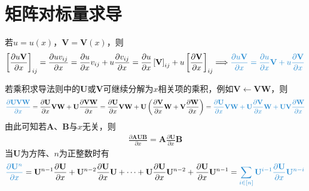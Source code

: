 \documentclass{ctexart}
\newcommand{\blue}[1]{\textcolor{Solarized-blue}{#1}}
\theoremstyle{definition}
\def \Av {\mathbf{A}}
\def \Bv {\mathbf{B}}
\def \Uv {\mathbf{U}}
\def \Vv {\mathbf{V}}
\def \Wv {\mathbf{W}}
\begin{document}
\section{矩阵对标量求导}

若$u = u(x)$，$\Vv = \Vv(x)$，则
\begin{align*}
    \left[ \frac{\partial u \Vv}{\partial x} \right]_{ij} = \frac{\partial u v_{ij}}{\partial x} = \frac{\partial u}{\partial x} v_{ij} + u \frac{\partial v_{ij}}{\partial x} = \frac{\partial u}{\partial x} \left[ \Vv \right]_{ij} + u \left[ \frac{\partial \Vv}{\partial x} \right]_{ij} \Longrightarrow \blue{\frac{\partial u \Vv}{\partial x} = \frac{\partial u}{\partial x} \Vv + u \frac{\partial \Vv}{\partial x}}
\end{align*}

若乘积求导法则中的$\Uv$或$\Vv$可继续分解为$x$相关项的乘积，例如$\Vv \leftarrow \Vv \Wv$，则
\begin{align} \label{eq: product}
    \blue{\frac{\partial \Uv \Vv \Wv}{\partial x}} = \frac{\partial \Uv}{\partial x} \Vv \Wv + \Uv \frac{\partial \Vv \Wv}{\partial x} = \frac{\partial \Uv}{\partial x} \Vv \Wv + \Uv \left( \frac{\partial \Vv}{\partial x} \Wv + \Vv \frac{\partial \Wv}{\partial x} \right) = \blue{\frac{\partial \Uv}{\partial x} \Vv \Wv + \Uv \frac{\partial \Vv}{\partial x} \Wv + \Uv \Vv \frac{\partial \Wv}{\partial x}}
\end{align}
由此可知若$\Av$、$\Bv$与$x$无关，则
\begin{align*}
    \frac{\partial \Av \Uv \Bv}{\partial x} = \Av \frac{\partial \Uv}{\partial x} \Bv
\end{align*}
当$\Uv$为方阵、$n$为正整数时有
\begin{align} \label{eq: power}
    \blue{\frac{\partial \Uv^n}{\partial x}} = \Uv^{n-1} \frac{\partial \Uv}{\partial x} + \Uv^{n-2} \frac{\partial \Uv}{\partial x} \Uv + \cdots + \Uv \frac{\partial \Uv}{\partial x} \Uv^{n-2} + \frac{\partial \Uv}{\partial x} \Uv^{n-1} = \blue{\sum_{i \in [n]} \Uv^{i-1} \frac{\partial \Uv}{\partial x} \Uv^{n-i}}
\end{align}
\end{document}

